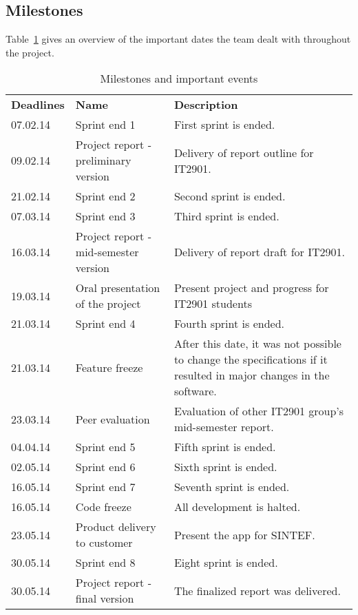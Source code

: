 \subsection{Milestones}
Table~\ref{tab:milestones} gives an overview of the important dates the team dealt with throughout the project. 

\begin{table}[H]
\centering
{}
\begin{tabular}{|l|p{6.7cm}|p{6.5cm}|}
\hline
\textbf{Deadlines} & \textbf{Name} & \textbf{Description}\\
07.02.14 & Sprint end 1 & First sprint is ended. \\
09.02.14& Project report - preliminary version & Delivery of report outline for IT2901.\\
21.02.14& Sprint end 2 & Second sprint is ended. \\
07.03.14& Sprint end 3 & Third sprint is ended.\\
16.03.14& Project report - mid-semester version &  Delivery of report draft for IT2901. \\
19.03.14 & Oral presentation of the project & Present project and progress for IT2901 students\\
21.03.14& Sprint end 4 & Fourth sprint is ended.\\
21.03.14 & Feature freeze & After this date, it was not possible to change the specifications if it resulted in major changes in the software.\\
23.03.14 & Peer evaluation &  Evaluation of other IT2901 group's mid-semester report. \\
04.04.14& Sprint end 5 & Fifth sprint is ended.\\
02.05.14& Sprint end 6 & Sixth sprint is ended.\\
16.05.14& Sprint end 7 & Seventh sprint is ended.\\
16.05.14& Code freeze & All development is halted.\\
23.05.14& Product delivery to customer & Present the app for SINTEF.\\ 
30.05.14& Sprint end 8 & Eight sprint is ended.\\
30.05.14 & Project report - final version & The finalized report was delivered.\\\hline
\end{tabular}
\caption{Milestones and important events}
\label{tab:milestones}
\end{table}
\newpage

